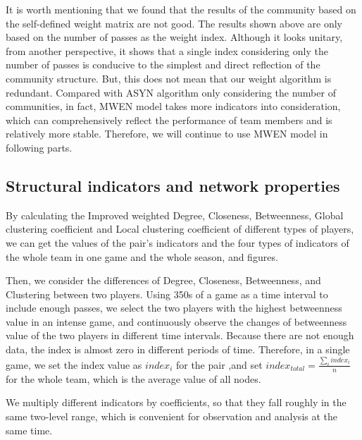 \documentclass{mcmthesis}
\begin{document}
It is worth mentioning that we found that the results of the community based on the self-defined weight matrix are not good. The results shown above are only based on the number of passes as the weight index. Although it looks unitary, from another perspective, it shows that a single index considering only the number of passes is conducive to the simplest and direct reflection of the community structure. But, this does not mean that our weight algorithm is redundant. Compared with ASYN algorithm only considering the number of communities, in fact, MWEN model takes more indicators into consideration, which can comprehensively reflect the performance of team members and is relatively more stable. Therefore, we will continue to use MWEN model in following parts.


\subsection{Structural indicators and network properties}
By calculating the Improved weighted Degree, Closeness, Betweenness, Global clustering coefficient and Local clustering coefficient of different types of players, we can get the values of the pair's indicators and the four types of indicators of the whole team in one game and the whole season, and figures.


Then, we consider the differences of Degree, Closeness, Betweenness, and Clustering between two players. Using 350s of a game as a time interval to include enough passes, we select the two players with the highest betweenness value in an intense game, and continuously observe the changes of betweenness value of the two players in different time intervals. Because there are not enough data, the index is almost zero in different periods of time. Therefore, in a single game, we set the index value as $index_i$ for the pair ,and set $index_{total}=\frac{\sum_{i} index_{i}}{n}$  for the whole team, which is the average value of all nodes.


We multiply different indicators by coefficients, so that they fall roughly in the same two-level range, which is convenient for observation and analysis at the same time.
\end{document}
